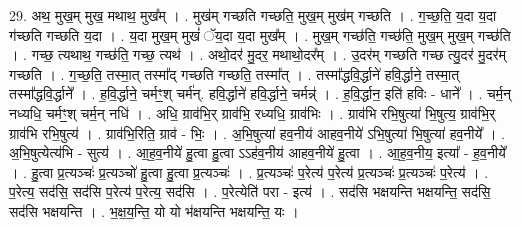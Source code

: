 \documentclass[17pt]{extarticle}
\begin{document}
29. अथ॒ मुख॒म् मुख॒ मथाथ॒ मुख᳚म् । . मुख॑म् गच्छति गच्छति॒ मुख॒म् मुख॑म् गच्छति । . ग॒च्छ॒ति॒ य॒दा य॒दा ग॑च्छति गच्छति य॒दा । . य॒दा मुख॒म् मुखं॑ ॅय॒दा य॒दा मुख᳚म् । . मुख॒म् गच्छ॑ति॒ गच्छ॑ति॒ मुख॒म् मुख॒म् गच्छ॑ति । . गच्छ॒ त्यथाथ॒ गच्छ॑ति॒ गच्छ॒ त्यथ॑ । . अथो॒दर॑ मु॒दर॒ मथाथो॒दर᳚म् । . उ॒दर॑म् गच्छति गच्छ त्यु॒दर॑ मु॒दर॑म् गच्छति । . ग॒च्छ॒ति॒ तस्मा॒त् तस्मा᳚द् गच्छति गच्छति॒ तस्मा᳚त् । . तस्मा᳚द्धवि॒र्द्धाने॑ हवि॒र्द्धाने॒ तस्मा॒त् तस्मा᳚द्धवि॒र्द्धाने᳚ । . ह॒वि॒र्द्धाने॒ चर्मꣳ॒॒श् चर्म॑न्. हवि॒र्द्धाने॑ हवि॒र्द्धाने॒ चर्मन्न्॑ । . ह॒वि॒र्द्धान॒ इति॑ हविः - धाने᳚ । . चर्म॒न् नध्यधि॒ चर्मꣳ॒॒श् चर्म॒न् नधि॑ । . अधि॒ ग्राव॑भि॒र् ग्राव॑भि॒ रध्यधि॒ ग्राव॑भिः । . ग्राव॑भि रभि॒षुत्या॑ भि॒षुत्य॒ ग्राव॑भि॒र् ग्राव॑भि रभि॒षुत्य॑ । . ग्राव॑भि॒रिति॒ ग्राव॑ - भिः॒ । . अ॒भि॒षुत्या॑ हव॒नीय॑ आहव॒नीये॑ ऽभि॒षुत्या॑ भि॒षुत्या॑ हव॒नीये᳚ । . अ॒भि॒षुत्येत्य॑भि - सुत्य॑ । . आ॒ह॒व॒नीये॑ हु॒त्वा हु॒त्वा ऽऽह॑व॒नीय॑ आहव॒नीये॑ हु॒त्वा । . आ॒ह॒व॒नीय॒ इत्या᳚ - ह॒व॒नीये᳚ । . हु॒त्वा प्र॒त्यञ्चः॑ प्र॒त्यञ्चो॑ हु॒त्वा हु॒त्वा प्र॒त्यञ्चः॑ । . प्र॒त्यञ्चः॑ प॒रेत्य॑ प॒रेत्य॑ प्र॒त्यञ्चः॑ प्र॒त्यञ्चः॑ प॒रेत्य॑ । . प॒रेत्य॒ सद॑सि॒ सद॑सि प॒रेत्य॑ प॒रेत्य॒ सद॑सि । . प॒रेत्येति॑ परा - इत्य॑ । . सद॑सि भक्षयन्ति भक्षयन्ति॒ सद॑सि॒ सद॑सि भक्षयन्ति । . भ॒क्ष॒य॒न्ति॒ यो यो भ॑क्षयन्ति भक्षयन्ति॒ यः । \newline
\end{document}
